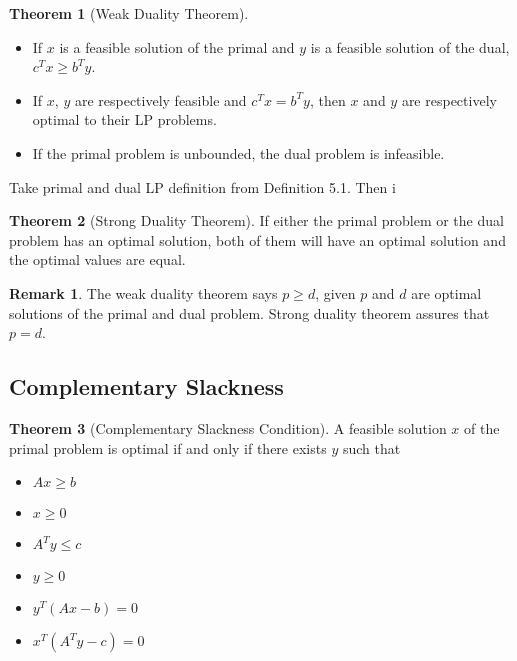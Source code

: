 \documentclass{article}
\theoremstyle{definition}
\newtheorem{theorem}{Theorem}[section]
\newtheorem*{remark}{Remark}
\begin{document}
	\begin{theorem}[Weak Duality Theorem]\hfill
	    \begin{itemize}
	        \item If $x$ is a feasible solution of the primal and $y$ is a feasible solution of the dual, $c^Tx \geq b^Ty$.
	        \item If $x$, $y$ are respectively feasible and $c^Tx = b^Ty$, then $x$ and $y$ are respectively optimal to their LP problems.
	        \item If the primal problem is unbounded, the dual problem is infeasible.
	    \end{itemize}
		Take primal and dual LP definition from Definition 5.1. Then i
	\end{theorem}

	\begin{theorem}[Strong Duality Theorem]
		If either the primal problem or the dual problem has an optimal solution, both of them will have an optimal solution and the optimal values are equal.
	\end{theorem}

	\begin{remark}
		The weak duality theorem says $p \geq d$, given $p$ and $d$ are optimal solutions of the primal and dual problem. Strong duality theorem assures that $p = d$.
	\end{remark}
	
	\subsection{Complementary Slackness}
	\begin{theorem}[Complementary Slackness Condition]\hfill\break
		A feasible solution $x$ of the primal problem is optimal if and only if there exists $y$ such that
		\begin{itemize}
		    \item $Ax \geq b$
		    \item $x \geq 0$
		    \item $A^T y \leq c$
		    \item $y \geq 0$
		    \item $y^T (Ax-b) = 0$
		    \item $x^T (A^Ty-c) = 0$
		\end{itemize}
	\end{theorem}
    
\end{document}
